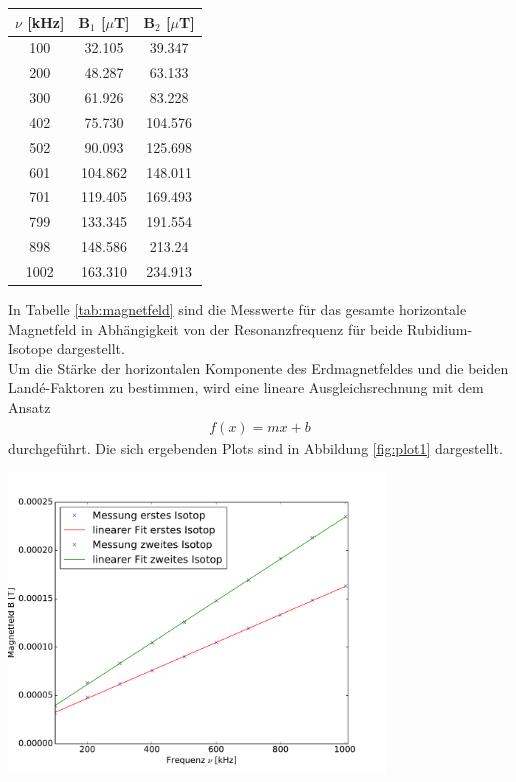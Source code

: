 \documentclass[]{scrartcl}
\begin{document}
\begin{center}
	\begin{tabular}{|c|c|c|}
	\hline $\nu$ [kHz] & B$_1$ [$\mu$T] & B$_2$ [$\mu$T] \\
	\hline	100	&	32.105	&	39.347	\\
	\hline	200	&	48.287	&	63.133	\\
	\hline	300	&	61.926	&	83.228	\\
	\hline	402	&	75.730	&	104.576	\\
	\hline	502	&	90.093	&	125.698	\\
	\hline	601	&	104.862	&	148.011	\\
	\hline	701	&	119.405	&	169.493	\\
	\hline	799	&	133.345	&	191.554	\\
	\hline	898	&	148.586	&	213.24	\\
	\hline	1002	&	163.310	&	234.913	\\
	\hline 
	\end{tabular}
\label{tab:magnetfeld}
\end{center}
In Tabelle \ref{tab:magnetfeld} sind die Messwerte für das gesamte horizontale Magnetfeld in Abhängigkeit von der Resonanzfrequenz für beide Rubidium-Isotope dargestellt. \\
Um die Stärke der horizontalen Komponente des Erdmagnetfeldes und die beiden Landé-Faktoren zu bestimmen, wird eine lineare Ausgleichsrechnung mit dem Ansatz
\begin{align}
f(x)=mx+b
\end{align}
durchgeführt. Die sich ergebenden Plots sind in Abbildung \ref{fig:plot1} dargestellt.
\begin{center}
	\includegraphics[width=10cm]{images/plot1.pdf}
	\label{fig:plot1}
\end{center}
\end{document}
